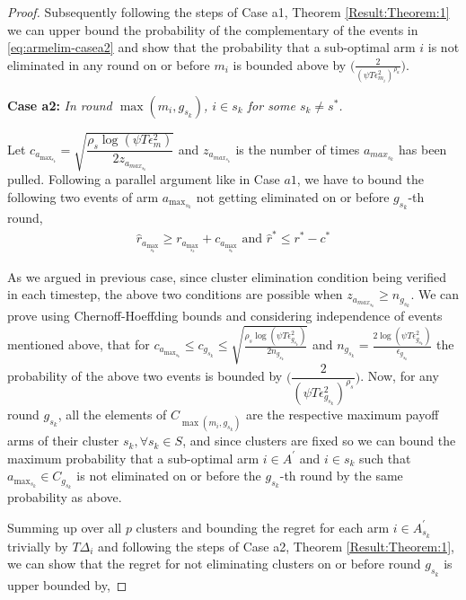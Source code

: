 \begin{proof}
Subsequently following the steps of Case a1, Theorem \ref{Result:Theorem:1} we can upper bound the probability of the complementary of the events in \ref{eq:armelim-casea2} and show that the probability that a sub-optimal arm ${i}$ is not eliminated in any round on or before $m_{i}$ is bounded above by  $\bigg(\frac{2}{(\psi T\epsilon_{m_{i}}^{2})^{\rho_{a}}}\bigg)$.

\textbf{Case a2:} \textit{In round $\max(m_{i},g_{s_{k}})$, ${i} \in s_k$ for some $s_k \ne s^{*}$.}

Let $c_{a_{\max_{s_{k}}}}=\sqrt{\dfrac{\rho_{s}\log{(\psi T\epsilon_{m}^{2})}}{2 z_{a_{max_{s_{k}}}}}}$ and $z_{a_{max_{s_{k}}}}$ is the number of times $a_{max_{s_{k}}}$ has been pulled. Following a parallel argument like in Case $a1$, we have to bound the following two events of arm $a_{\max_{s_{k}}}$ not getting eliminated on or before $g_{s_{k}}$-th round,
\begin{align*}
  \hat{r}_{a_{\max_{s_{k}}}} \geq r_{a_{\max_{s_{k}}}} +c_{a_{\max_{s_{k}}}} \text{ and } \hat{r}^{*} \leq r^{*} -c^{*}  
\end{align*} 

As we argued in previous case, since cluster elimination condition being verified in each timestep, the above two conditions are possible when $z_{a_{max_{s_{k}}}} \geq n_{g_{s_{k}}}$. We can prove using Chernoff-Hoeffding bounds and considering independence of events mentioned above, that for $c_{a_{\max_{s_{k}}}} \leq c_{g_{s_{k}}} \leq \sqrt{\frac{\rho_{s} \log (\psi T\epsilon_{g_{s_{k}}}^{2})}{2 n_{g_{s_{k}}}}}$ and  $n_{g_{s_{k}}}=\frac{2\log{(\psi T\epsilon_{g_{s_{k}}}^{2})}}{\epsilon_{g_{s_{k}}}}$ the probability of the above two events is bounded by $\bigg(\dfrac{2}{(\psi  T\epsilon_{g_{s_{k}}}^{2})^{\rho_{s}}}\bigg)$.
  Now, for any round $g_{s_{k}}$, all the elements of $C_{\max(m_{i},g_{s_{k}})}$ are the respective maximum payoff arms of their cluster $s_{k}, \forall s_{k}\in S$, and since clusters are fixed so we can bound the maximum probability that a sub-optimal arm ${i}\in A^{'}$  and ${i}\in s_{k}$ such that $a_{\max_{s_{k}}}\in C_{g_{s_{k}}}$ is not eliminated on or before the $g_{s_{k}}$-th round by the same probability as above. 

Summing up over all $p$ clusters and bounding the regret for each arm $i\in A_{s_{k}}^{'}$ trivially by $T\Delta_{i}$ and following the steps of Case a2, Theorem \ref{Result:Theorem:1}, we can show that the regret for not eliminating clusters on or before round $g_{s_{k}}$ is upper bounded by,


\end{proof}
